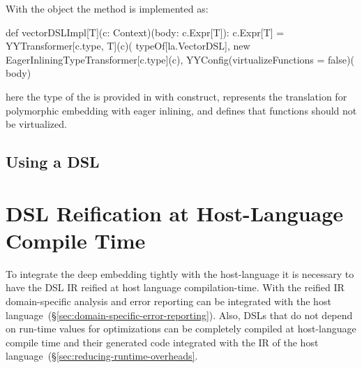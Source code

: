 With the  object the method  is implemented as:\begin{lstparagraph}
  def vectorDSLImpl[T](c: Context)(body: c.Expr[T]): c.Expr[T] =
    YYTransformer[c.type, T](c)(
      typeOf[la.VectorDSL],
      new EagerInliningTypeTransformer[c.type](c),
      YYConfig(virtualizeFunctions = false)(
      body)
\end{lstparagraph}

here the type of the  is provided in with  construct,
 represents the translation for polymorphic embedding with eager inlining,
 and  defines that functions should not be virtualized.

\section{Using a \yy DSL}
\label{sec:using-a-dsl}




\chapter{DSL Reification at Host-Language Compile Time}
\label{sec:compile-time-reification}

To integrate the deep embedding tightly with the host-language it is necessary to
 have the DSL IR reified at host language compilation-time. With the reified IR
 domain-specific analysis and error reporting can be integrated with the host language~(\S \ref{sec:domain-specific-error-reporting}).
 Also, DSLs that do not depend on run-time values for optimizations can be completely compiled
 at host-language compile time and their generated code integrated with the IR of the host language~(\S \ref{sec:reducing-runtime-overheads}.

